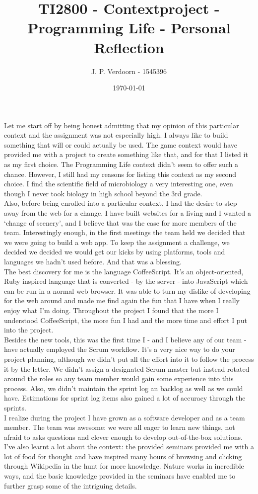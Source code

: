 \documentclass{article}
\title{TI2800 - Contextproject - Programming Life - Personal Reflection}
\author{J. P. Verdoorn - 1545396}
\date{\today}
\begin{document}
	\maketitle
Let me start off by being honest admitting that my opinion of this particular context and the assignment was not especially high. I always like to build something that will or could actually be used. The game context would have provided me with a project to create something like that, and for that I listed it as my first choice. The Programming Life context didn’t seem to offer such a chance. However, I still had my reasons for listing this context as my second choice. I find the scientific field of microbiology a very interesting one, even though I never took biology in high school beyond the 3rd grade. \\

Also, before being enrolled into a particular context, I had the desire to step away from the web for a change. I have built websites for a living and I wanted a ‘change of scenery’, and I believe that was the case for more members of the team. Interestingly enough, in the first meetings the team held we decided that we were going to build a web app. To keep the assignment a challenge, we decided we decided we would get our kicks by using platforms, tools and languages we hadn’t used before. And that was a blessing. \\

The best discovery for me is the language CoffeeScript. It’s an object-oriented, Ruby inspired language that is converted - by the server - into JavaScript which can be run in a normal web browser. It was able to turn my dislike of developing for the web around and made me find again the fun that I have when I really enjoy what I’m doing. Throughout the project I found that the more I understood CoffeeScript, the more fun I had and the more time and effort I put into the project. \\

Besides the new tools, this was the first time I - and I believe any of our team - have actually employed the Scrum workflow. It’s a very nice way to do your project planning, although we didn’t put all the effort into it to follow the process it by the letter. We didn’t assign a designated Scrum master but instead rotated around the roles so any team member would gain some experience into this process. Also, we didn’t maintain the sprint log an backlog as well as we could have. Estimations for sprint log items also gained a lot of accuracy through the sprints. \\

I realize during the project I have grown as a software developer and as a team member. The team was awesome: we were all eager to learn new things, not afraid to asks questions and clever enough to develop out-of-the-box solutions. I’ve also learnt a lot about the context: the provided seminars provided me with a lot of food for thought and have inspired many hours of browsing and clicking through Wikipedia in the hunt for more knowledge. Nature works in incredible ways, and the basic knowledge provided in the seminars have enabled me to further grasp some of the intriguing details.
\end{document}
